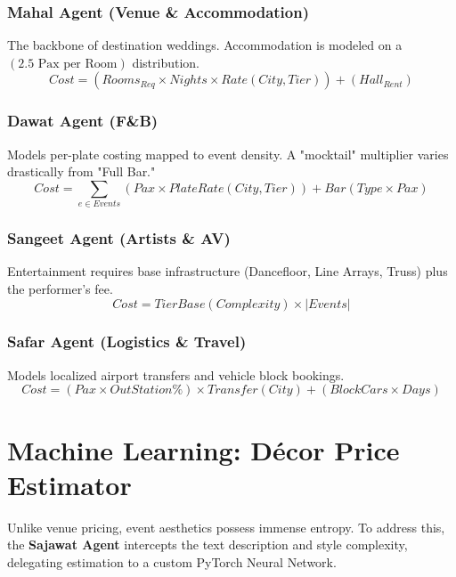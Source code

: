 \documentclass[11pt, a4paper]{report}
\begin{document}
\subsection{Mahal Agent (Venue \& Accommodation)}
The backbone of destination weddings. Accommodation is modeled on a \((2.5 \text{ Pax per Room})\) distribution.
\begin{equation}
    Cost = (Rooms_{Req} \times Nights \times Rate(City, Tier)) + (Hall_{Rent})
\end{equation}

\subsection{Dawat Agent (F\&B)}
Models per-plate costing mapped to event density. A "mocktail" multiplier varies drastically from "Full Bar."
\begin{equation}
    Cost = \sum_{e \in Events} (Pax \times PlateRate(City, Tier)) + Bar(Type \times Pax)
\end{equation}

\subsection{Sangeet Agent (Artists \& AV)}
Entertainment requires base infrastructure (Dancefloor, Line Arrays, Truss) plus the performer's fee.
\begin{equation}
    Cost = TierBase(Complexity) \times |Events|
\end{equation}

\subsection{Safar Agent (Logistics \& Travel)}
Models localized airport transfers and vehicle block bookings.
\begin{equation}
    Cost = (Pax \times OutStation \%) \times Transfer(City) + (BlockCars \times Days)
\end{equation}

\chapter{Machine Learning: Décor Price Estimator}

Unlike venue pricing, event aesthetics possess immense entropy. To address this, the \textbf{Sajawat Agent} intercepts the text description and style complexity, delegating estimation to a custom PyTorch Neural Network.
\end{document}
